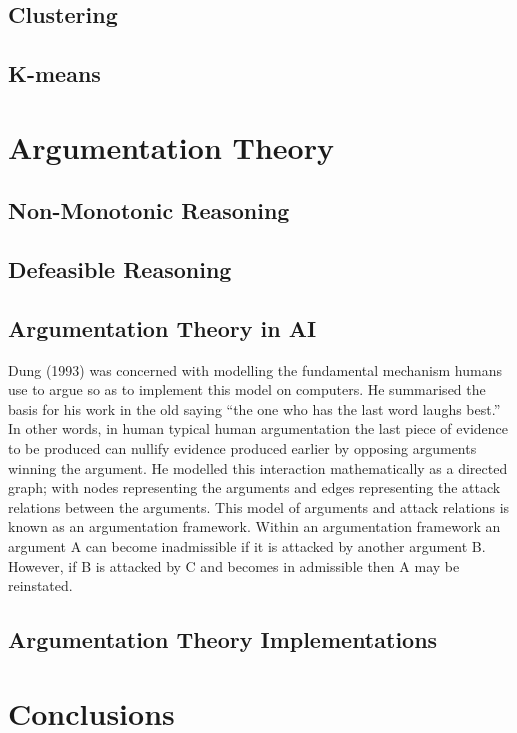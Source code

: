 \subsection{Clustering}

\subsection{K-means}


\section{Argumentation Theory}

\subsection{Non-Monotonic Reasoning}

\subsection{Defeasible Reasoning}

\subsection{Argumentation Theory in AI}

Dung (1993) was concerned with modelling the fundamental mechanism humans use to argue so as to implement this model on computers. He summarised the basis for his work in the old saying “the one who has the last word laughs best.” In other words, in human typical human argumentation the last piece of evidence to be produced can nullify evidence produced earlier by opposing arguments winning the argument.
He modelled this interaction mathematically as a directed graph; with nodes representing the arguments and edges representing the attack relations between the arguments. This model of arguments and attack relations is known as an argumentation framework.
Within an argumentation framework an argument A can become inadmissible if it is attacked by another argument B. However, if B is attacked by C and becomes in admissible then A may be reinstated.

\subsection{Argumentation Theory Implementations}


\section{Conclusions}
